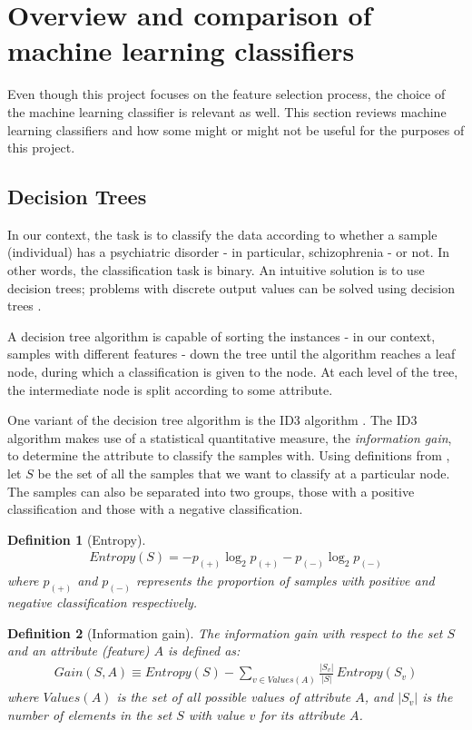 \documentclass[12pt, twoside, a4paper]{report}
\begin{document}
\section{Overview and comparison of machine learning classifiers} \label{bg_ML}
Even though this project focuses on the feature selection process, the choice of the machine learning classifier is relevant as well. This section reviews machine learning classifiers and how some might or might not be useful for the purposes of this project.

\subsection{Decision Trees} \label{bg:ml:decisionTree}
In our context, the task is to classify the data according to whether a sample (individual) has a psychiatric disorder - in particular, schizophrenia - or not. In other words, the classification task is binary. An intuitive solution is to use decision trees; problems with discrete output values can be solved using decision trees \cite{RefWorks:98}.

A decision tree algorithm is capable of sorting the  instances - in our context, samples with different features - down the tree until the algorithm reaches a leaf node, during which a classification is given to the node. At each level of the tree, the intermediate node is split according to some attribute.

One variant of the decision tree algorithm is the ID3 algorithm \cite{RefWorks:99}. The ID3 algorithm makes use of a statistical quantitative measure, the \textit{information gain}, to determine the attribute to classify the samples with. Using definitions from \cite{RefWorks:98}, let $S$ be the set of all the samples that we want to classify at a particular node. The samples can also be separated into two groups, those with a positive classification and those with a negative classification.

\newtheorem{mydef}{Definition}[subsection]

\begin{mydef}[Entropy]
\begin{align*}
Entropy(S) = -p_{(+)} \log_2 p_{(+)} - p_{(-)} \log_2 p_{(-)}
\end{align*}
where $p_{(+)}$ and $p_{(-)}$ represents the proportion of samples with positive and negative classification respectively.
\end{mydef}

\begin{mydef}[Information gain]
The information gain with respect to the set $S$ and an attribute (feature) $A$ is defined as:
\begin{align*}
Gain(S, A) \equiv Entropy(S) - \sum_{v \in Values(A)} \frac{|S_v|}{|S|} \, Entropy(S_v)
\end{align*}
where $Values(A)$ is the set of all possible values of attribute $A$, and $|S_v|$ is the number of elements in the set $S$ with value $v$ for its attribute $A$.
\end{mydef}
\end{document}
